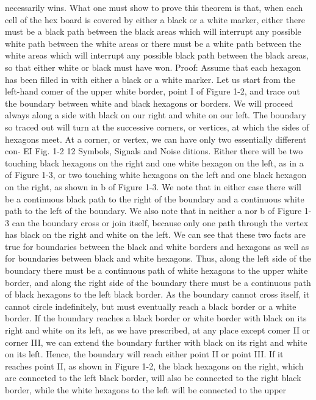 necessarily wins. What one must show to prove this theorem is
that, when each cell of the hex board is covered by either a black
or a white marker, either there must be a black path between the
black areas which will interrupt any possible white path between
the white areas or there must be a white path between the white
areas which will interrupt any possible black path between the
black areas, so that either white or black must have won.
Proof: Assume that each hexagon has been filled in with either
a black or a white marker. Let us start from the left-hand comer
of the upper white border, point I of Figure 1-2, and trace out the
boundary between white and black hexagons or borders. We will
proceed always along a side with black on our right and white on
our left. The boundary so traced out will turn at the successive
corners, or vertices, at which the sides of hexagons meet. At a
corner, or vertex, we can have only two essentially different con-
EI
Fig. 1-2
12 Symbols, Signals and Noise
ditions. Either there will be two touching black hexagons on the
right and one white hexagon on the left, as in a of Figure 1-3, or
two touching white hexagons on the left and one black hexagon
on the right, as shown in b of Figure 1-3. We note that in either
case there will be a continuous black path to the right of the
boundary and a continuous white path to the left of the boundary.
We also note that in neither a nor b of Figure 1-3 can the boundary
cross or join itself, because only one path through the vertex has
black on the right and white on the left. We can see that these two
facts are true for boundaries between the black and white borders
and hexagons as well as for boundaries between black and white
hexagons. Thus, along the left side of the boundary there must be
a continuous path of white hexagons to the upper white border,
and along the right side of the boundary there must be a continuous
path of black hexagons to the left black border. As the
boundary cannot cross itself, it cannot circle indefinitely, but must
eventually reach a black border or a white border. If the boundary
reaches a black border or white border with black on its right and
white on its left, as we have prescribed, at any place except comer
II or corner III, we can extend the boundary further with black on
its right and white on its left. Hence, the boundary will reach either
point II or point III. If it reaches point II, as shown in Figure 1-2,
the black hexagons on the right, which are connected to the left
black border, will also be connected to the right black border,
while the white hexagons to the left will be connected to the upper

